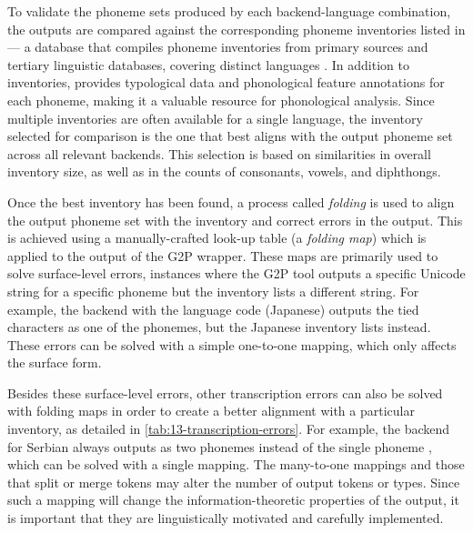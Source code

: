 To validate the phoneme sets produced by each backend-language combination, the outputs are compared against the corresponding phoneme inventories listed in \phoible --- a database that compiles phoneme inventories from primary sources and tertiary linguistic databases, covering  distinct languages \citep{phoible}. In addition to inventories, \phoible provides typological data and phonological feature annotations for each phoneme, making it a valuable resource for phonological analysis. Since multiple inventories are often available for a single language, the inventory selected for comparison is the one that best aligns with the output phoneme set across all relevant backends. This selection is based on similarities in overall inventory size, as well as in the counts of consonants, vowels, and diphthongs.

Once the best inventory has been found, a process called \emph{folding} is used to align the output phoneme set with the inventory and correct errors in the output. This is achieved using a manually-crafted look-up table (a \emph{folding map}) which is applied to the output of the G2P wrapper. These maps are primarily used to solve surface-level errors, instances where the G2P tool outputs a specific Unicode string for a specific phoneme but the inventory lists a different string. For example, the \phonemizer backend with the  language code (Japanese) outputs the tied characters  as one of the phonemes, but the Japanese inventory lists  instead. These errors can be solved with a simple one-to-one mapping, which only affects the surface form.

Besides these surface-level errors, other transcription errors can also be solved with folding maps in order to create a better alignment with a particular \phoible inventory, as detailed in \cref{tab:13-transcription-errors}. For example, the \epitran backend for Serbian always outputs  as two phonemes instead of the single phoneme , which can be solved with a single mapping. The many-to-one mappings and those that split or merge tokens may alter the number of output tokens or types. Since such a mapping will change the information-theoretic properties of the output, it is important that they are linguistically motivated and carefully implemented. 

